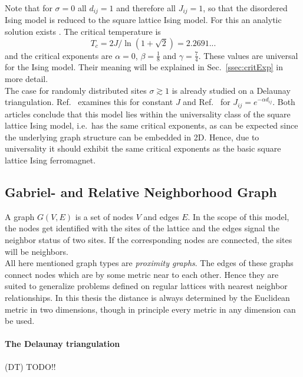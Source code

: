    Note that for \(\sigma = 0\) all \(d_{ij} = 1\) and therefore all
    \(J_{ij} = 1\), so that the disordered Ising model is reduced to the
    square lattice Ising model. For this an analytic solution exists \cite{Onsager1944}.
    The critical temperature is
    \begin{equation}
        T_c = 2J/\ln(1+\sqrt 2) = 2.2691...
        \label{eq:exactTc}
    \end{equation}
    and the critical exponents are \(\alpha = 0\), \(\beta = \frac{1}{8}\)
    and \(\gamma = \frac{7}{4}\). These values are universal for the Ising
    model. Their meaning will be explained in Sec.\ \ref{ssec:critExp} in more detail.\\
    The case for randomly distributed sites \(\sigma \gtrsim 1\) is
    already studied on a Delaunay triangulation. Ref.\ \cite{Janke1994} examines
    this for constant \(J\) and Ref.\ \cite{Lima2000} for \(J_{ij} = e^{-\alpha d_{ij}}\).
    Both articles conclude that this model lies within the universality
    class of the square lattice Ising model, i.e.\ has the same critical
    exponents, as can be expected since the underlying graph structure can
    be embedded in 2D. Hence, due to universality it should exhibit the same
    critical exponents as the basic square lattice Ising ferromagnet.

\subsection{Gabriel- and Relative Neighborhood Graph}
\label{ssec:graphtypes}
    A graph \(G(V,E)\) is a set of nodes \(V\) and edges \(E\). In the
    scope of this model, the nodes get identified with the sites of the
    lattice and the edges signal the neighbor status of two sites. If the
    corresponding nodes are connected, the sites will be neighbors.\\
    All here mentioned graph types are \emph{proximity graphs}.
    The edges of these graphs connect nodes which are by some metric near
    to each other.
    Hence they are suited to generalize problems defined on regular
    lattices with nearest neighbor relationships.
    In this thesis the distance is always determined by the Euclidean
    metric in two dimensions, though in principle every metric in any
    dimension can be used.\\
    \paragraph{The Delaunay triangulation} (DT) TODO!!

